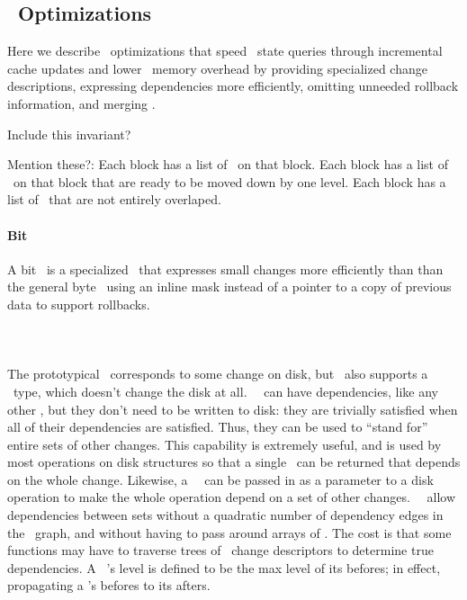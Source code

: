 \subsection{\ChDesc\ Optimizations}
\label{sec:design:chdesc-opts}

Here we describe \chdesc\ optimizations that speed \chdesc\ state
queries through incremental cache updates
%
and lower \chdesc\ memory overhead by
%
providing specialized change descriptions,
%
expressing dependencies more efficiently,
%
omitting unneeded rollback information,
%
and merging \chdescs.

Include this invariant?

Mention these?:
%
Each block has a list of \chdescs\ on that block.
%
Each block has a list of \chdescs\ on that block that are ready to be
moved down by one level.
%
Each block has a list of \chdescs\ that are not entirely overlaped.

\paragraph{Bit \ChDescs}
\label{sec:design:chdescs:bit}
A bit \chdesc\ is a specialized \chdesc\ that expresses small changes
more efficiently than than the general byte \chdesc\, using an inline
mask instead of a pointer to a copy of previous data to support rollbacks.

\paragraph{\Noop\ \ChDescs}
\label{sec:design:chdescs:noop}
The prototypical \chdesc\ corresponds to some change on disk, but \Kudos\
 also supports a \emph{\noop} \chdesc\ type, which doesn't change the disk
 at all.
%
%
\Noop\ \chdescs\ can have dependencies, like any other
\chdesc, but they don't need to be written to disk:  they are trivially satisfied when all of their dependencies are
satisfied.
%
Thus, they can be used to ``stand for'' entire sets of other changes.
%
This capability is extremely useful, and is used by most operations on disk
structures so that a single \chdesc\ can be returned that depends on the whole
change. Likewise, a \noop\ \chdesc\ can be passed in as a parameter to a disk
operation to make the whole operation depend on a set of other changes. \Noop\
\chdescs\ allow dependencies between sets without a quadratic number
of dependency edges in the \chdesc\ graph, and without having to pass around
arrays of \chdescs.
%
The cost is that some functions may have to traverse trees of \noop\ change
 descriptors to determine true dependencies.
%
A \noop\ \chdesc's level is defined to be the max level of its befores;
in effect, propagating a \noop's befores to its afters.

